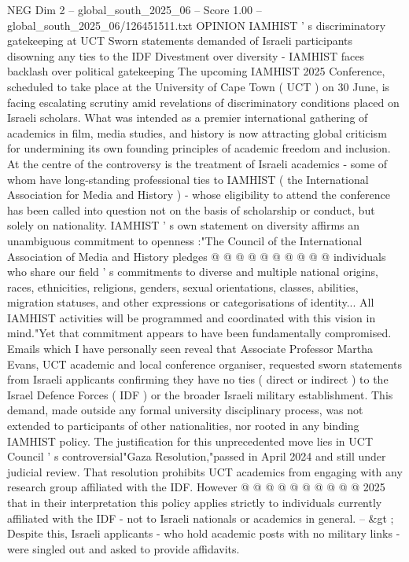 \begin{textsample}{NEG Dim 2 – global\_south\_2025\_06 – Score 1.00 – global\_south\_2025\_06/126451511.txt}  \label{ex:f2_neg_194}
OPINION IAMHIST ' s discriminatory gatekeeping at UCT Sworn statements demanded of Israeli participants disowning any ties to the IDF Divestment over diversity - IAMHIST faces backlash over political gatekeeping The upcoming IAMHIST 2025 Conference, scheduled to take place at the University of Cape Town ( UCT ) on 30 June, is facing escalating scrutiny amid revelations of discriminatory conditions placed on Israeli scholars.
What was intended as a premier international gathering of academics in film, media studies, and history is now attracting global criticism for undermining its own founding principles of academic freedom and inclusion.
At the centre of the controversy is the treatment of Israeli academics - some of whom have long-standing professional ties to IAMHIST ( the International Association for Media and History ) - whose eligibility to attend the conference has been called into question not on the basis of scholarship or conduct, but solely on nationality.
IAMHIST ' s own statement on diversity affirms an unambiguous commitment to openness :"The Council of the International Association of Media and History pledges @ @ @ @ @ @ @ @ @ @ individuals who share our field ' s commitments to diverse and multiple national origins, races, ethnicities, religions, genders, sexual orientations, classes, abilities, migration statuses, and other expressions or categorisations of identity...
All IAMHIST activities will be programmed and coordinated with this vision in mind."Yet that commitment appears to have been fundamentally compromised.
Emails which I have personally seen reveal that Associate Professor Martha Evans, UCT academic and local conference organiser, requested sworn statements from Israeli applicants confirming they have no ties ( direct or indirect ) to the Israel Defence Forces ( IDF ) or the broader Israeli military establishment.
This demand, made outside any formal university disciplinary process, was not extended to participants of other nationalities, nor rooted in any binding IAMHIST policy.
The justification for this unprecedented move lies in UCT Council ' s controversial"Gaza Resolution,"passed in April 2024 and still under judicial review.
That resolution prohibits UCT academics from engaging with any research group affiliated with the IDF.
However @ @ @ @ @ @ @ @ @ @ 2025 that in their interpretation this policy applies strictly to individuals currently affiliated with the IDF - not to Israeli nationals or academics in general. -- \&gt ; Despite this, Israeli applicants - who hold academic posts with no military links - were singled out and asked to provide affidavits.

\end{textsample}
